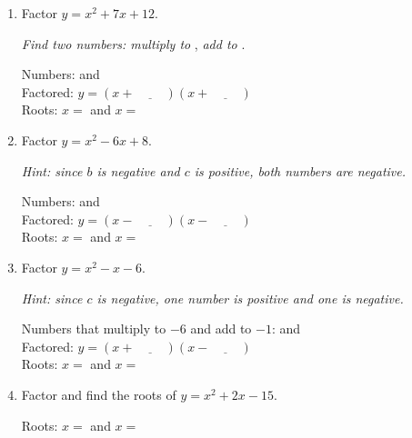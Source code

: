 \documentclass[12pt]{article}
\newcommand{\blank}[1][4cm]{\underline{\hspace{#1}}}
\begin{document}
\begin{enumerate}[leftmargin=*, label=\textbf{\arabic*.}, resume]

\item Factor $y = x^2 + 7x + 12$.

  \textit{Find two numbers: multiply to} \blank[1.5cm], \textit{add to} \blank[1.5cm].

  \begin{workbox}
  Numbers: \blank[1.5cm] and \blank[1.5cm] \\[10pt]
  Factored: $y = (x + \blank[1cm])(x + \blank[1cm])$ \\[10pt]
  Roots: $x = $ \blank[1.5cm] and $x = $ \blank[1.5cm]
  \end{workbox}

\vspace{8pt}
\item Factor $y = x^2 - 6x + 8$.

  \textit{Hint: since $b$ is negative and $c$ is positive, both numbers are negative.}

  \begin{workbox}
  Numbers: \blank[1.5cm] and \blank[1.5cm] \\[10pt]
  Factored: $y = (x - \blank[1cm])(x - \blank[1cm])$ \\[10pt]
  Roots: $x = $ \blank[1.5cm] and $x = $ \blank[1.5cm]
  \end{workbox}

\vspace{8pt}
\item Factor $y = x^2 - x - 6$.

  \textit{Hint: since $c$ is negative, one number is positive and one is negative.}

  \begin{workbox}
  Numbers that multiply to $-6$ and add to $-1$: \blank[1.5cm] and \blank[1.5cm] \\[10pt]
  Factored: $y = (x + \blank[1cm])(x - \blank[1cm])$ \\[10pt]
  Roots: $x = $ \blank[1.5cm] and $x = $ \blank[1.5cm]
  \end{workbox}

\vspace{8pt}
\item Factor and find the roots of $y = x^2 + 2x - 15$.

  \begin{workbox}
  \vspace{2.5cm}
  Roots: $x = $ \blank[1.5cm] and $x = $ \blank[1.5cm]
  \end{workbox}

\end{enumerate}
\end{document}
